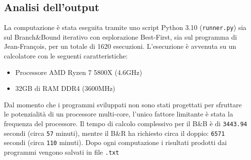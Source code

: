 \documentclass[
    article,            %
    12pt,                %
    oneside,            %
    a4paper,            %
    english,            %
    italian,                %
    sumario=tradicional,
]{abntex2}
\begin{document}
\subsection{Analisi dell'output}

La computazione è stata eseguita tramite uno script Python 3.10 (\texttt{runner.py}) sia sul Branch\&Bound iterativo con esplorazione Best-First, sia sul programma di Jean-François, per un totale di 1620 esecuzioni.
L'esecuzione è avvenuta su un calcolatore con le seguenti caratteristiche:
    \begin{itemize}
        \item Processore AMD Ryzen 7 5800X (4.6GHz)
        \item 32GB di RAM DDR4 (3600MHz)
    \end{itemize}
Dal momento che i programmi sviluppati non sono stati progettati per sfruttare le potenzialità di un processore multi-core, l'unico fattore limitante è stata la frequenza del processore.
\newline
Il tempo di calcolo complessivo per il B\&B è di \texttt{3443.94} secondi (circa \texttt{57} minuti), mentre il B\&R ha richiesto circa il doppio: \texttt{6571} secondi (circa \texttt{110} minuti). Dopo ogni computazione i risultati prodotti dai programmi vengono salvati in file \texttt{.txt}
\end{document}
